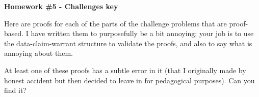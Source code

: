 \documentclass[12pt]{article}
\theoremstyle{definition} %
\newcommand{\Alert}[1]{\textcolor{xRed}{#1}}
\renewcommand{\section}[1]{\begin{center} \textbf{#1} \\\end{center}}
\begin{document}
\section{Homework \#5 - \Alert{Challenges key}} %

Here are proofs for each of the parts of the challenge problems that are proof-based. I have written them to purposefully be a bit annoying; your job is to use the data-claim-warrant structure to validate the proofs, and also to say what is annoying about them.

At least one of these proofs has a subtle error in it (that I originally made by honest accident but then decided to leave in for pedagogical purposes). Can you find it?
\end{document}
